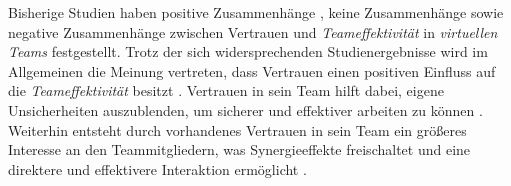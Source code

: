 \documentclass[a4paper,11pt]{article}%
\renewcommand{\\}{\vspace*{0.5\baselineskip} \newline}
\begin{document}
Bisherige Studien haben positive Zusammenhänge \citep{davis2000trusted}, keine Zusammenhänge \citep{hertel2004managing} sowie negative Zusammenhänge \citep{dirks1999effects} zwischen Vertrauen und \textit{Teameffektivität} in \textit{virtuellen Teams} festgestellt.
Trotz der sich widersprechenden Studienergebnisse wird im Allgemeinen die Meinung vertreten, dass Vertrauen einen positiven Einfluss auf die \textit{Teameffektivität} besitzt \citep{de2016trust}. 
Vertrauen in sein Team hilft dabei, eigene Unsicherheiten auszublenden, um sicherer und effektiver arbeiten zu können \citep{de2010does}. Weiterhin entsteht durch vorhandenes Vertrauen in sein Team ein größeres Interesse an den Teammitgliedern, was Synergieeffekte freischaltet und eine direktere und effektivere Interaktion ermöglicht \citep{dirks1999effects}. 
	

%	
\end{document}
